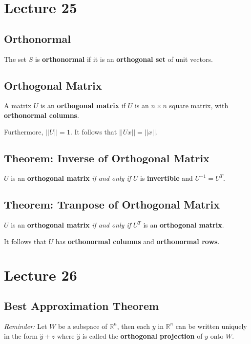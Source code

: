 \documentclass[12pt, letterpaper]{article}
\begin{document}
  \section*{Lecture 25}

  \subsection*{Orthonormal}

  The set $ S $ is \textbf{orthonormal} if it is an
  \textbf{orthogonal set} of unit vectors.

  \subsection*{Orthogonal Matrix}

  A matrix $ U $ is an \textbf{orthogonal matrix} if $ U $ is an $ n
  \times n $ square matrix, with \textbf{orthonormal columns}.
  \bigskip

  Furthermore, $  || U || = 1 $. It follows that $ || Ux || = ||x|| $.

  \subsection*{Theorem: Inverse of Orthogonal Matrix}

  $ U $ is an \textbf{orthogonal matrix} \textit{if and only if} $ U
  $ is \textbf{invertible} and $ U^{-1} = U^T $.
  \bigskip

  \subsection*{Theorem: Tranpose of Orthogonal Matrix}

  $ U $ is an \textbf{orthogonal matrix} \textit{if and only if} $
  U^T $ is an \textbf{orthogonal matrix}.
  \bigskip

  It follows that $ U $ has \textbf{orthonormal columns} and
  \textbf{orthonormal rows}.

  \section*{Lecture 26}

  \subsection*{Best Approximation Theorem}

  \textit{Reminder:} Let $ W $ be a subspace of $ \mathbb{R}^n $,
  then each $ y $ in $ \mathbb{R}^n $ can be written uniquely in the
  form $ \hat{y} + z $ where $ \hat{y} $ is called the
  \textbf{orthogonal projection} of $ y $ onto $ W $.
  \bigskip
\end{document}
